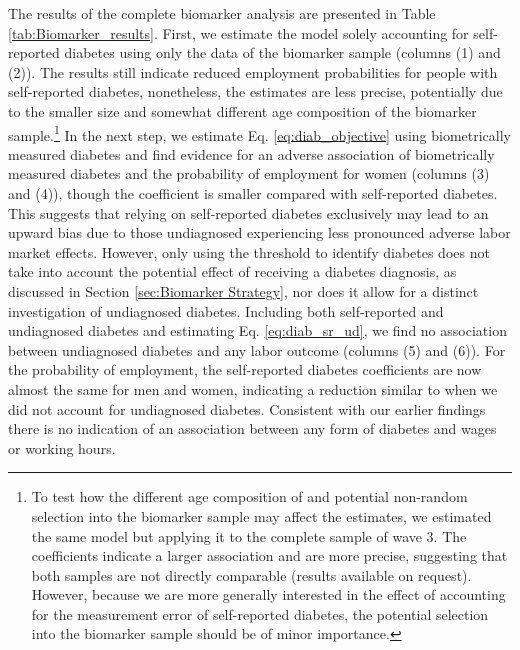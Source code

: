 \documentclass[12pt,english]{article}
\begin{document}
{The results of the complete biomarker analysis are presented in Table \ref{tab:Biomarker_results}. First, we estimate the model solely accounting for self-reported diabetes using only the data of the biomarker sample (columns (1) and (2)). The results still indicate reduced employment probabilities for people with self-reported diabetes, nonetheless, the estimates are less precise, potentially due to the smaller size and somewhat different age composition of the biomarker sample.\footnote{To test how the different age composition of and potential non-random selection into the biomarker sample may affect the estimates, we estimated the same model but applying it to the complete sample of wave 3. The coefficients indicate a larger association and are more precise, suggesting that both samples are not directly comparable (results available on request). However, because we are more generally interested in the effect of accounting for the measurement error of self-reported diabetes, the potential selection into the biomarker sample should be of minor importance.}
In the next step, we estimate Eq. \ref{eq:diab_objective} using biometrically measured
diabetes and find evidence for an adverse association of biometrically measured diabetes and the probability of employment for women (columns (3) and (4)), though the coefficient is smaller compared with self-reported diabetes. This suggests that relying on self-reported diabetes exclusively may lead to an upward bias due to those undiagnosed experiencing less pronounced adverse labor market effects. However, only using the threshold to identify diabetes does not take into account the potential effect of receiving a diabetes diagnosis, as discussed in Section \ref{sec:Biomarker Strategy}, nor does it allow for a distinct investigation of undiagnosed diabetes.
Including both self-reported and undiagnosed diabetes and estimating Eq. \ref{eq:diab_sr_ud}, we find no association between undiagnosed diabetes and any labor outcome (columns (5) and (6)). For the probability of employment, the self-reported diabetes coefficients are now almost the same for men and women, indicating a reduction similar to when we did not account for undiagnosed diabetes. Consistent with our earlier findings there is no indication of an association between any form of diabetes and wages or working hours. 
 

}
\end{document}
